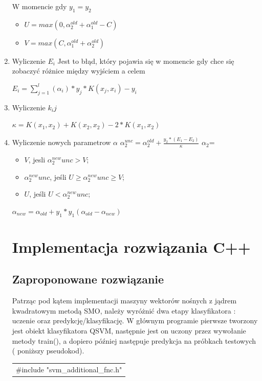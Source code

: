 \documentclass[[10pt,a4paper]{article}
\begin{document}
\begin{enumerate}
 
W momencie gdy $y_{1}=y_{2}$
\begin{itemize}
\item$ U = max(0,\alpha_{2}^{old} + \alpha_{1}^{old} - C)$
 \item $ V = max(C, \alpha_{1}^{old} + \alpha_{2}^{old})$
 
\end{itemize}
\item Wyliczenie $E_i$ Jest to błąd, który pojawia się w momencie gdy chce się zobaczyć różnice między wyjściem a celem

$ E_i = \sum_{j=1}^{l}(\alpha_{i})*y_{j}*K(x_j,x_i)-y_i$

\item Wyliczenie $k_ij$

$\kappa = K(x_1,x_2) + K(x_2,x_2) - 2*K(x_1,x_2)$

\item Wyliczenie nowych parametrow $\alpha$ \newline
$\alpha_{2}^{unc} = \alpha_{2}^{old} + \frac{y_2*(E_1-E_2)}{\kappa}$
\newline
$\alpha_{2}$= 
\begin{itemize}
\item $V$, jesli $\alpha_{2}^{new}{unc}>V$;
\item $\alpha_{2}^{new}{unc}$, jeśli $U\ge\alpha_{2}^{new}{unc}\ge V$;
\item $U$, jeśli $U<\alpha_{2}^{new}{unc}$;
\newline
\end{itemize}
$\alpha_{new} = \alpha_{old} + y_{1}*y_{1}(\alpha_{old}-\alpha_{new})$
\newpage
\section{Implementacja rozwiązania C++}
\subsection{Zaproponowane rozwiązanie}
Patrząc pod kątem implementacji maszyny wektorów nośnych z jądrem kwadratowym metodą SMO, należy wyróżnić dwa etapy klasyfikatora : uczenie oraz predykcję/klasyfikację. W głównym programie pierwsze tworzony jest obiekt klasyfikatora QSVM, następnie jest on uczony przez wywołanie metody train(), a dopiero później następuje predykcja na próbkach testowych ( poniższy pseudokod).\\ 

\begin{tabular}{|p{11.5cm}|} \hline\noindent \#include "svm\_additional\_fnc.h"


\end{tabular}
\end{enumerate}
\end{document}

